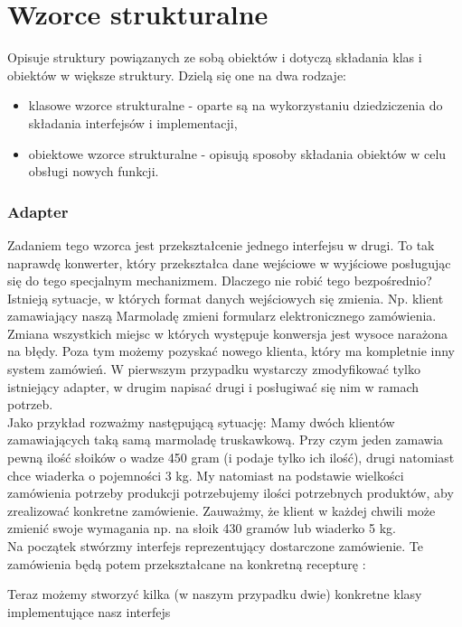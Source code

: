 \documentclass[12pt,a4paper]{article}
\begin{document}
	\part{Wzorce strukturalne}
	Opisuje struktury powiązanych ze sobą obiektów i dotyczą składania klas i obiektów w większe struktury. Dzielą się one na dwa rodzaje:
	\begin{itemize}
		\item klasowe wzorce strukturalne - oparte są na wykorzystaniu dziedziczenia do składania interfejsów i implementacji,
		\item obiektowe wzorce strukturalne - opisują sposoby składania obiektów w celu obsługi nowych funkcji.\cite{GoF}
	\end{itemize}
	\section{Adapter}
	Zadaniem tego wzorca jest przekształcenie jednego interfejsu w drugi. To tak naprawdę konwerter, który przekształca dane wejściowe w wyjściowe posługując się do tego specjalnym mechanizmem. Dlaczego nie robić tego bezpośrednio? Istnieją sytuacje, w których format danych wejściowych się zmienia. Np. klient zamawiający naszą Marmoladę zmieni formularz elektronicznego zamówienia. Zmiana wszystkich miejsc w których występuje konwersja jest wysoce narażona na błędy. Poza tym możemy pozyskać nowego klienta, który ma kompletnie inny system zamówień. W pierwszym przypadku wystarczy zmodyfikować tylko istniejący adapter, w drugim napisać drugi i posługiwać się nim w ramach potrzeb.\\
	Jako przykład rozważmy następującą sytuację: Mamy dwóch klientów zamawiających taką samą marmoladę truskawkową. Przy czym jeden zamawia pewną ilość słoików o wadze 450 gram (i podaje tylko ich ilość), drugi natomiast chce wiaderka o pojemności 3 kg. My natomiast na podstawie wielkości zamówienia potrzeby produkcji potrzebujemy ilości potrzebnych produktów, aby zrealizować konkretne zamówienie. Zauważmy, że klient w każdej chwili może zmienić swoje wymagania np. na słoik 430 gramów lub wiaderko 5 kg. \\
	Na początek stwórzmy interfejs reprezentujący dostarczone zamówienie. Te zamówienia będą potem przekształcane na konkretną recepturę :
	
	Teraz możemy stworzyć kilka (w naszym przypadku dwie) konkretne klasy implementujące nasz interfejs
	
	
\end{document}

